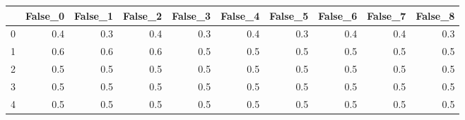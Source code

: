 \begin{tabular}{lrrrrrrrrr}
\toprule
{} &  False\_0 &  False\_1 &  False\_2 &  False\_3 &  False\_4 &  False\_5 &  False\_6 &  False\_7 &  False\_8 \\ \hline
\midrule
0 &      0.4 &      0.3 &      0.4 &      0.3 &      0.4 &      0.3 &      0.4 &      0.4 &      0.3 \\ \hline
1 &      0.6 &      0.6 &      0.6 &      0.5 &      0.5 &      0.5 &      0.5 &      0.5 &      0.5 \\ \hline
2 &      0.5 &      0.5 &      0.5 &      0.5 &      0.5 &      0.5 &      0.5 &      0.5 &      0.5 \\ \hline
3 &      0.5 &      0.5 &      0.5 &      0.5 &      0.5 &      0.5 &      0.5 &      0.5 &      0.5 \\ \hline
4 &      0.5 &      0.5 &      0.5 &      0.5 &      0.5 &      0.5 &      0.5 &      0.5 &      0.5 \\ \hline
\bottomrule
\end{tabular}
